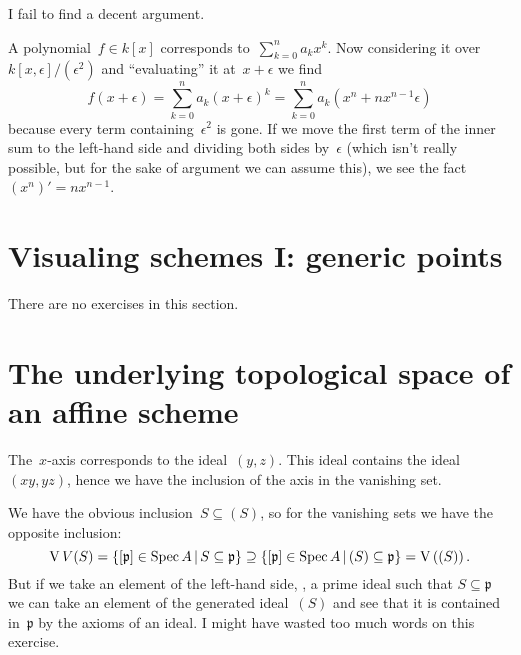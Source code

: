 \begin{exercise} %
  I fail to find a decent argument.
\end{exercise}

\begin{exercise}
  A polynomial~$f\in k[x]$ corresponds to~$\sum_{k=0}^na_kx^k$. Now considering it over~$k[x,\epsilon]/(\epsilon^2)$ and ``evaluating'' it at~$x+\epsilon$ we find
  \begin{equation}
    f(x+\epsilon)=\sum_{k=0}^na_k(x+\epsilon)^k=\sum_{k=0}^na_k\left( x^n+nx^{n-1}\epsilon \right)
  \end{equation}
  because every term containing~$\epsilon^2$ is gone. If we move the first term of the inner sum to the left-hand side and dividing both sides by~$\epsilon$ (which isn't really possible, but for the sake of argument we can assume this), we see the fact~$(x^n)'=nx^{n-1}$.
\end{exercise}


\section{Visualing schemes I: generic points}

There are no exercises in this section.


\section{The underlying topological space of an affine scheme}

\begin{exercise}
  The~$x$\nobreakdash-axis corresponds to the ideal~$(y,z)$. This ideal contains the ideal~$(xy,yz)$, hence we have the inclusion of the axis in the vanishing set.
\end{exercise}

\begin{exercise}
  We have the obvious inclusion~$S\subseteq(S)$, so for the vanishing sets we have the opposite inclusion:
  \begin{equation}
    \operatorname{V}{V}(S)=\left\{ [\mathfrak{p}]\in\operatorname{Spec} A\,|\, S\subseteq\mathfrak{p} \right\}\supseteq\left\{ [\mathfrak{p}]\in\operatorname{Spec} A\,|\, (S)\subseteq\mathfrak{p} \right\}=\operatorname{V}\left( (S) \right).
  \end{equation}
  But if we take an element of the left-hand side, \ie, a prime ideal such that $S\subseteq\mathfrak{p}$ we can take an element of the generated ideal~$(S)$ and see that it is contained in~$\mathfrak{p}$ by the axioms of an ideal. I might have wasted too much words on this exercise.
\end{exercise}

